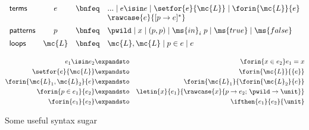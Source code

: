 \documentclass[preprint]{sigplanconf}
\renewcommand{\pipe}{\mathrel{\mid}} %
\begin{document}
\begin{figure}
  \[\begin{array}{lccl}
  \textsf{terms} &
  e &\bnfeq& ... \pipe e \isin e \pipe \setfor{e}{\mc{L}}
             \pipe \forin{\mc{L}}{e}\\
  &&& \rawcase{e}{[{p} \to {e}]^*}
  \vspace{0.5em}\\
  \textsf{patterns} &
  p &\bnfeq& \pwild \pipe x \pipe (p,p) \pipe \ms{in}_i\;p
             \pipe \ms{true} \pipe \ms{false}
  \vspace{0.5em}\\
  \textsf{loops} &
  \mc{L} &\bnfeq& \mc{L}, \mc{L} \pipe p \in e \pipe e
  \end{array}\]

  \begin{eqnarray*}
    e_1 \isin e_2            &\expandsto& \forin{x \in e_2} e_1 = x\\
    \setfor{e}{\mc{L}}       &\expandsto& \forin{\mc{L}}{\{e\}}\\
    \forin{\mc{L}_1,\mc{L}_2}{e}
    &\expandsto& \forin{\mc{L}_1}{\forin{\mc{L}_2}{e}}\\
    \forin{p\in e_1}{e_2}
    &\expandsto& \letin{x}{e_1}{\rawcase{x}{p \to e_2;\,\pwild \to \unit}}\\
    \forin{e_1}{e_2} &\expandsto& \ifthen{e_1}{e_2}{\unit}
  \end{eqnarray*}
  \caption{Some useful syntax sugar}
\end{figure}
\end{document}
